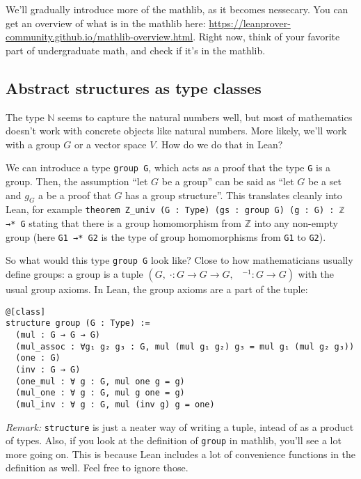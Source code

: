 \documentclass[a4paper, 12pt]{article}
\newcommand{\N}{\mathbb{N}}
\newcommand{\Z}{\mathbb{Z}}
\newcommand{\lean}[1]{\texttt{#1}}
\theoremstyle{changedot}
\theoremstyle{changedotbreak}
\theoremstyle{nonumberplain}
\begin{document}
We'll gradually introduce more of the mathlib, as it becomes nessecary. You can get an overview of what is in the mathlib here: {\footnotesize \url{https://leanprover-community.github.io/mathlib-overview.html}}. Right now, think of your favorite part of undergraduate math, and check if it's in the mathlib.

\subsection{Abstract structures as type classes}
The type $\N$ seems to capture the natural numbers well, but most of mathematics doesn't work with concrete objects like natural numbers. More likely, we'll work with a group $G$ or a vector space $V$. How do we do that in Lean?

We can introduce a type \lean{group G}, which acts as a proof that the type \lean{G} is a group. Then, the assumption ``let $G$ be a group'' can be said as ``let $G$ be a set and $g_{G}$ a be a proof that $G$ has a group structure''. This translates cleanly into Lean, for example \lean{theorem Z_univ (G : Type) (gs : group G) (g : G)  : ℤ →* G} stating that there is a group homomorphism from $\Z$ into any non-empty group (here \lean{G1 →* G2} is the type of group homomorphisms from \lean{G1} to \lean{G2}).

So what would this type \lean{group G} look like? Close to how mathematicians usually define groups: a group is a tuple $(G,\; \cdot : G \to G \to G,\;\;\; ^{-1} : G \to G)$ with the usual group axioms. In Lean, the group axioms are a part of the tuple:

\begin{verbatim}
@[class]
structure group (G : Type) :=
  (mul : G → G → G)
  (mul_assoc : ∀g₁ g₂ g₃ : G, mul (mul g₁ g₂) g₃ = mul g₁ (mul g₂ g₃))
  (one : G)
  (inv : G → G)
  (one_mul : ∀ g : G, mul one g = g)
  (mul_one : ∀ g : G, mul g one = g)
  (mul_inv : ∀ g : G, mul (inv g) g = one)
\end{verbatim}

\textit{Remark:} \lean{structure} is just a neater way of writing a tuple, intead of as a product of types. Also, if you look at the definition of \lean{group} in mathlib, you'll see a lot more going on. This is because Lean includes a lot of convenience functions in the definition as well. Feel free to ignore those.
\end{document}

